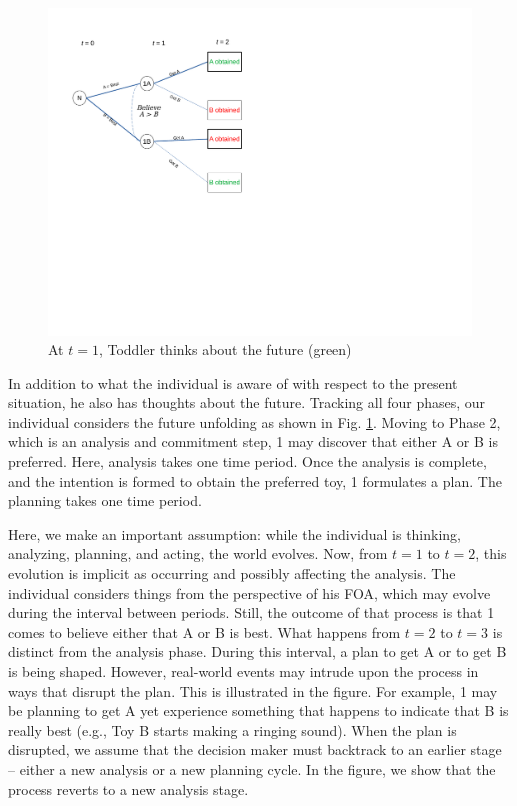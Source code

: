 \documentclass[
11pt,
titlepage,
reqno,
]{article}%
\theoremstyle{definition}
\begin{document}
\begin{figure}[h!]
	\centering
	\includegraphics*[page=4,trim = 0in 1in 0in 0in,scale=.65]{Awareness_Diagrams_All}
	\caption{At $t=1$, Toddler thinks about the future (green)\label{Diag: p-04}}%
\end{figure}

In addition to what the individual is aware of with respect to the present situation, he also has thoughts about the future. Tracking all four phases, our individual considers the future unfolding as shown in Fig. \ref{Diag: p-04}. Moving to Phase 2, which is an analysis and commitment step, 1 may discover that either A or B is preferred. Here, analysis takes one time period. Once the analysis is complete, and the intention is formed to obtain the preferred toy, 1 formulates a plan. The planning takes one time period.

Here, we make an important assumption: while the individual is thinking, analyzing, planning, and acting, the world evolves. Now, from $t=1$ to $t=2$, this evolution is implicit as occurring and possibly affecting the analysis. The individual considers things from the perspective of his FOA, which may evolve during the interval between periods. Still, the outcome of that process is that 1 comes to believe either that A or B is best. What happens from $t=2$ to $t=3$ is distinct from the analysis phase. During this interval, a plan to get A or to get B is being shaped. However, real-world events may intrude upon the process in ways that disrupt the plan. This is illustrated in the figure. For example, 1 may be planning to get A yet experience something that happens to indicate that B is really best (e.g., Toy B starts making a ringing sound). When the plan is disrupted, we assume that the decision maker must backtrack to an earlier stage -- either a new analysis or a new planning cycle. In the figure, we show that the process reverts to a new analysis stage.
\end{document}
